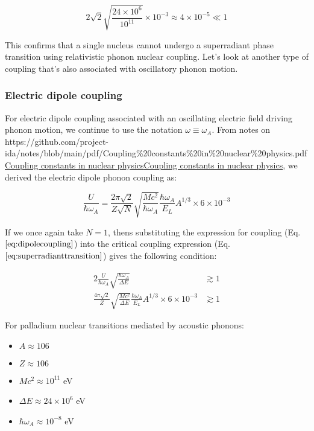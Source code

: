 \documentclass[
]{article}
\let\oldhref\href
\renewcommand{\href}[2]{\ifx#1\urlprefix\oldhref{#1}{#2}\else\uline{\oldhref{#1}{#2}}\fi}
\renewcommand{\[}{\begin{equation}}
\renewcommand{\]}{\end{equation}}
\providecommand{\tightlist}{%
  \setlength{\itemsep}{0pt}\setlength{\parskip}{0pt}}
\begin{document}
\[
2\sqrt{2} \sqrt{\frac{24\times10^6}{10^{11}}}  \times 10^{-3} \approx 4 \times 10^{-5} \ll 1
\label{eq:criticalphononcouplingexplicitnumbers}
\]

This confirms that a single nucleus cannot undergo a superradiant phase
transition using relativistic phonon nuclear coupling. Let's look at
another type of coupling that's also associated with oscillatory phonon
motion.

\subsubsection{Electric dipole coupling}\label{electric-dipole-coupling}

For electric dipole coupling associated with an oscillating electric
field driving phonon motion, we continue to use the notation
\(\omega \equiv \omega_A\). From notes on
\href{https://github.com/project-ida/notes/blob/main/pdf/Coupling\%20constants\%20in\%20nuclear\%20physics.pdf}{Coupling
constants in nuclear physics}, we derived the electric dipole phonon
coupling as:

\[
\frac{U}{\hbar \omega_A} = \frac{2\pi\sqrt{2}}{Z \sqrt{N}} \sqrt{\frac{M c^2}{\hbar \omega_A}} \frac{\hbar \omega_A}{E_L} A^{1/3} \times 6 \times 10^{-3}
\label{eq:dipolecoupling}
\]

If we once again take \(N=1\), thens substituting the expression for
coupling (Eq. \(\ref{eq:dipolecoupling}\)) into the critical coupling
expression (Eq. \(\ref{eq:superradianttransition}\)) gives the following
condition:

\[
\begin{aligned}
2\frac{U}{\hbar\omega_A}\sqrt{\frac{\hbar\omega_A}{\Delta E}} &\gtrsim 1 \\
\frac{4\pi\sqrt{2}}{Z} \sqrt{\frac{M c^2}{\Delta E}} \frac{\hbar \omega_A}{E_L} A^{1/3} \times 6 \times 10^{-3} &\gtrsim 1
\end{aligned}
\label{eq:criticaldipolecouplingexplicit}
\]

For palladium nuclear transitions mediated by acoustic phonons:

\begin{itemize}
\tightlist
\item
  \(A \approx 106\)
\item
  \(Z \approx 106\)
\item
  \(M c^2 \approx 10^{11}\) eV
\item
  \(\Delta E \approx 24 \times 10^{6}\) eV\\
\item
  \(\hbar \omega_A \approx 10^{-8}\) eV
\end{itemize}
\end{document}
